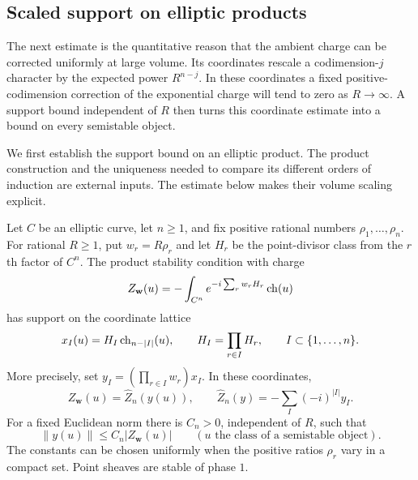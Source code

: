\subsection{Scaled support on elliptic products}

The next estimate is the quantitative reason that the ambient charge can
be corrected uniformly at large volume.  Its coordinates rescale a
codimension-$j$ character by the expected power $R^{n-j}$.  In these
coordinates a fixed positive-codimension correction of the exponential
charge will tend to zero as $R\to\infty$.  A support bound independent
of $R$ then turns this coordinate estimate into a bound on every
semistable object.

We first establish the support bound on an elliptic product.  The product
construction and the uniqueness needed to compare its different orders
of induction are external inputs.  The estimate below makes their volume
scaling explicit.

\begin{lemma}
\label{lem:elliptic-scaled-support}
Let $C$ be an elliptic curve, let $n\ge1$, and fix positive rational
numbers $\rho_1,\ldots,\rho_n$.  For rational $R\ge1$, put
$w_r=R\rho_r$ and let $H_r$ be the point-divisor class from the $r$th
factor of $C^n$.  The product stability condition with charge
\[
 Z_{\mathbf w}(u)=-\int_{C^n}e^{-i\sum_rw_rH_r}\operatorname{ch}(u)
\]
has support on the coordinate lattice
\[
 x_I(u)=H_I\operatorname{ch}_{n-|I|}(u),\qquad
 H_I=\prod_{r\in I}H_r,\qquad I\subset\{1,\ldots,n\}.
\]
More precisely, set $y_I=(\prod_{r\in I}w_r)x_I$.  In these coordinates,
\[
 Z_{\mathbf w}(u)=\widehat Z_n(y(u)),\qquad
 \widehat Z_n(y)=-\sum_I(-i)^{|I|}y_I.
\]
For a fixed Euclidean norm there is $C_n>0$, independent of $R$, such that
\[
 \|y(u)\|\le C_n|Z_{\mathbf w}(u)|
 \qquad(u\text{ the class of a semistable object}).
\]
The constants can be chosen uniformly when the positive ratios $\rho_r$
vary in a compact set.  Point sheaves are stable of phase $1$.
\end{lemma}

